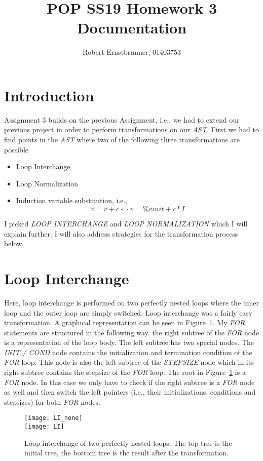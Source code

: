 \documentclass{scrartcl}
\title{POP SS19 Homework 3 Documentation}
\subtitle{Robert Ernstbrunner, 01403753}
\begin{document}
\maketitle

\section{Introduction}
Assignment 3 builds on the previous Assignment, i.e., we had to extend our previous project in order to perform transformations on our \textit{AST}. First we had to find points in the \textit{AST} where two of the following three transformations are possible
\begin{itemize}
\item Loop Interchange
\item Loop Normalization
\item Induction variable substitution, i.e., 
\begin{equation*}
	v=v+c \iff v=\%vinit+c*I
\end{equation*} 
\end{itemize}


I picked \textit{LOOP INTERCHANGE} and \textit{LOOP NORMALIZATION} which I will explain further. I will also address strategies for the transformation process below.

\section{Loop Interchange}
Here, loop interchange is performed on two perfectly nested loops where the inner loop and the outer loop are simply switched. Loop interchange was a fairly easy transformation. A graphical representation can be seen in Figure~\ref{fig:LI}. My \textit{FOR} statements are structured in the following way. the right subtree of the \textit{FOR} node is a representation of the loop body. The left subtree has two special nodes. The \textit{INIT / COND} node contains the initialization and termination condition of the \textit{FOR} loop. This node is also the left subtree of the \textit{STEPSIZE} node which in its right subtree contains the stepsize of the \textit{FOR} loop. The root in Figure~\ref{fig:LI} is a \textit{FOR} node. In this case we only have to check if the right subtree is a \textit{FOR} node as well and then switch the left pointers (i.e., their initializations, conditions and stepsizes) for both \textit{FOR} nodes.

\begin{figure}
\centering
\texttt{[image: LI\_none]}
\vspace{.5cm}\\
\texttt{[image: LI]}
\caption{Loop interchange of two perfectly nested loops. The top tree is the initial tree, the bottom tree is the result after the transformation.}
\label{fig:LI}
\end{figure}
\end{document}

